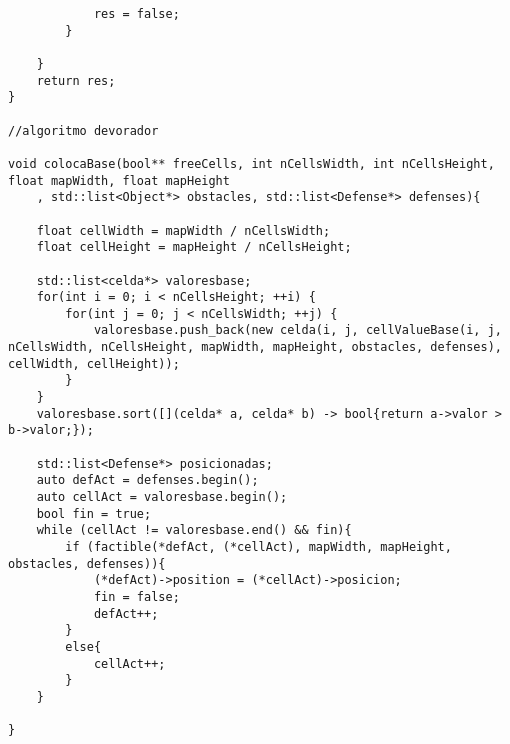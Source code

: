 \begin{lstlisting}
            res = false;
        }
        
    }
    return res;   
}

//algoritmo devorador

void colocaBase(bool** freeCells, int nCellsWidth, int nCellsHeight, float mapWidth, float mapHeight
    , std::list<Object*> obstacles, std::list<Defense*> defenses){

    float cellWidth = mapWidth / nCellsWidth;
    float cellHeight = mapHeight / nCellsHeight; 

    std::list<celda*> valoresbase;
    for(int i = 0; i < nCellsHeight; ++i) {
        for(int j = 0; j < nCellsWidth; ++j) {
            valoresbase.push_back(new celda(i, j, cellValueBase(i, j, nCellsWidth, nCellsHeight, mapWidth, mapHeight, obstacles, defenses), cellWidth, cellHeight));
        }
    }
    valoresbase.sort([](celda* a, celda* b) -> bool{return a->valor > b->valor;});

    std::list<Defense*> posicionadas;
    auto defAct = defenses.begin();
    auto cellAct = valoresbase.begin();
    bool fin = true;
    while (cellAct != valoresbase.end() && fin){
        if (factible(*defAct, (*cellAct), mapWidth, mapHeight, obstacles, defenses)){
            (*defAct)->position = (*cellAct)->posicion;
            fin = false;
            defAct++;
        }
        else{
            cellAct++;
        }
    }

}
\end{lstlisting}